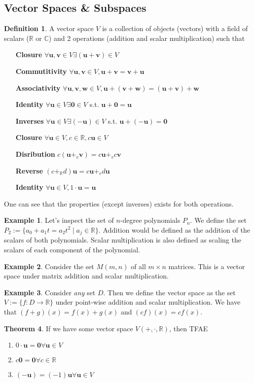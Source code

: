 \documentclass{article}
\numberwithin{equation}{section}
\theoremstyle{definition}
\newtheorem{thm}{Theorem}[subsection]
\newtheorem{defn}{Definition}[subsection]
\newtheorem{ex}[thm]{Example}
\newcommand{\V}{\mathbf{v}}
\newcommand{\U}{\mathbf{u}}
\newcommand{\W}{\mathbf{w}}
\newcommand{\R}{\mathbb{R}}
\newcommand{\C}{\mathbb{C}}
\let\oldforall\forall
\let\oldexists\exists
\renewcommand{\forall}{\mathrel{\oldforall}}
\renewcommand{\exists}{\mathrel{\oldexists}}
\theoremstyle{adefn}
\begin{document}
	\subsection{Vector Spaces \& Subspaces}
	\begin{defn}
		A vector space $V$ is a collection of objects (vectors) with a field of scalars ($\R$ or $\C$) and 2 operations (addition and scalar multiplication) such that \begin{enumerate}[leftmargin=3cm]
			\item[\textbf{Closure}] $\forall \U, \V \in V \exists (\U + \V) \in V$
			\item[\textbf{Commutitivity}] $\forall \U, \V \in V, \U + \V = \V + \U$
			\item[\textbf{Associativity}] $\forall \U, \V, \W \in V, \U + (\V + \W) = (\U + \V) + \W$
			\item[\textbf{Identity}] $\forall \U \in V \exists \textbf{0} \in V$ s.t. $\U + \textbf{0} = \U$
			\item[\textbf{Inverses}] $\forall \U \in V \exists (-\U) \in V$ s.t. $\U + (- \U) = \textbf{0}$
			\item[\textbf{Closure}] $\forall \U \in V, c \in \R, c\U \in V$
			\item[\textbf{Disribution}] $c(\U +_v \V) = c\U +_v c\V$
			\item[\textbf{Reverse}] $(c +_{\mathbb{R}} d)\U = c\U +_v d\U$
			\item[\textbf{Identity}] $\forall \U \in V, 1 \cdot \U = \U$
		\end{enumerate}
		One can see that the properties (except inverses) exists for both operations. 
	\end{defn}
	\begin{ex}
		Let's inspect the set of $n$-degree polynomials $P_n$. We define the set $P_2 := \{ a_0 + a_1t = a_2t^2 \mid a_j \in \R \}$. Addition would be defined as the addition of the scalars of both polynomials. Scalar multiplication is also defined as scaling the scalars of each component of the polynomial. 
	\end{ex}
	\begin{ex}
		Consider the set $M(m, n)$ of all $m \times n$ matrices. This is a vector space under matrix addition and scalar multiplication. 
	\end{ex}
	\begin{ex}
		Consider \emph{any} set $D$. Then we define the vector space as the set $V := \{ f: D \to \R \}$ under point-wise addition and scalar multiplication. We have that $(f + g)(x) = f(x) + g(x)$ and $(cf)(x) = cf(x)$. 
	\end{ex}
	\begin{thm}
		If we have some vector space $V(+, \cdot, \R)$, then TFAE
		\begin{enumerate}
			\item $0 \cdot \U = \textbf{0} \forall \U \in V$
			\item $c\textbf{0} = \textbf{0} \forall c \in \R$
			\item $(-\U) = (-1)\U \forall \U \in V$
		\end{enumerate} 
	\end{thm}
\end{document}
